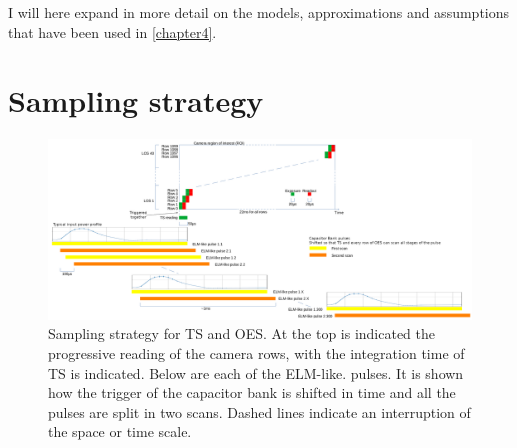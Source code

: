 

I will here expand in more detail on the models, approximations and assumptions that have been used in \autoref{chapter4}.

\section{Sampling strategy}\label{Sampling strategy}

\begin{figure}
	\centering
	\includegraphics[width=\linewidth,trim={0 0 0 0},clip]{Chapters/chapter3/figs/sampling_strategy_2.png}
	\caption{Sampling strategy for TS and OES. At the top is indicated the progressive reading of the camera rows, with the integration time of TS is indicated. Below are each of the ELM-like. pulses. It is shown how the trigger of the capacitor bank is shifted in time and all the pulses are split in two scans. Dashed lines indicate an interruption of the space or time scale.}
	\label{fig:sampling1}
\end{figure}

